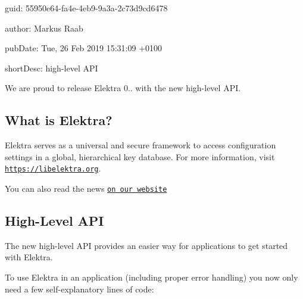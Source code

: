 
\begin{DoxyItemize}
\item guid\+: 55950e64-\/fa4e-\/4eb9-\/9a3a-\/2c73d9cd6478
\item author\+: Markus Raab
\item pub\+Date\+: Tue, 26 Feb 2019 15\+:31\+:09 +0100
\item short\+Desc\+: high-\/level A\+PI
\end{DoxyItemize}

We are proud to release Elektra 0.. with the new high-\/level A\+PI.

\subsection*{What is Elektra?}

Elektra serves as a universal and secure framework to access configuration settings in a global, hierarchical key database. For more information, visit \href{https://libelektra.org}{\tt https\+://libelektra.\+org}.

You can also read the news \href{https://www.libelektra.org/news/0.8.26-release}{\tt on our website}

\subsection*{High-\/\+Level A\+PI}

The new high-\/level A\+PI provides an easier way for applications to get started with Elektra.

To use Elektra in an application (including proper error handling) you now only need a few self-\/explanatory lines of code\+:


